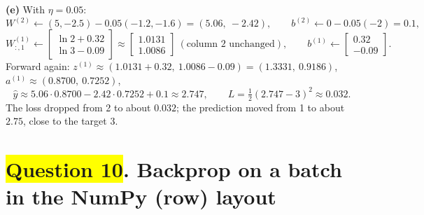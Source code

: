 \documentclass[12pt,a4paper]{article}
\newcommand{\hlq}[1]{{\setlength{\fboxsep}{1.5pt}\colorbox{yellow}{#1}}}
\begin{document}
\textbf{(e)} With $\eta=0.05$:
\[
W^{(2)}\leftarrow(5,-2.5)-0.05(-1.2,-1.6)=(5.06,\ -2.42),\qquad b^{(2)}\leftarrow0-0.05(-2)=0.1,
\]
\[
W^{(1)}_{:,1}\leftarrow\begin{bmatrix}\ln2+0.32\\ \ln3-0.09\end{bmatrix}\approx\begin{bmatrix}1.0131\\1.0086\end{bmatrix}\ (\text{column 2 unchanged}),\qquad b^{(1)}\leftarrow\begin{bmatrix}0.32\\-0.09\end{bmatrix}.
\]
Forward again: $z^{(1)}\approx(1.0131+0.32,\ 1.0086-0.09)=(1.3331,\ 0.9186)$, $a^{(1)}\approx(0.8700,\ 0.7252)$,
\[
\hat y\approx5.06\cdot0.8700-2.42\cdot0.7252+0.1\approx2.747,\qquad L=\tfrac12(2.747-3)^2\approx0.032 .
\]
The loss dropped from 2 to about $0.032$; the prediction moved from 1 to about $2.75$, close to the target 3.

\section[Question 10. Backprop on a batch in the NumPy (row) layout]{\hlq{Question 10}. Backprop on a batch in the NumPy (row) layout}
\end{document}
